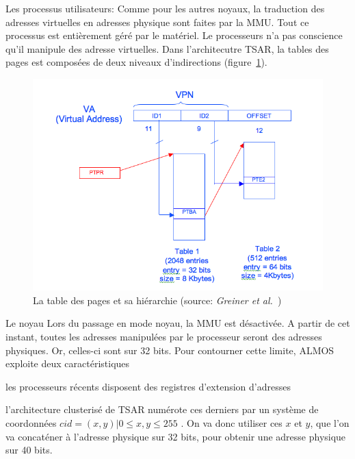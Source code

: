       \begin{paragraph}{Les processus utilisateurs:}
        Comme pour les autres noyaux, la traduction des adresses virtuelles en
        adresses physique sont faites par la MMU. Tout ce processus est
        entièrement géré par le matériel. Le processeurs n'a pas conscience
        qu'il manipule des adresse virtuelles. Dans l'architecutre TSAR, la
        tables des pages est composées de deux niveaux d'indirections
        (figure~\ref{fig:page-table}).
        
        \begin{figure}
          \centering
          \includegraphics[scale=0.35]{include/img/pages_table_levels.png}
          \caption{La table des pages et sa hiérarchie (source: \textit{Greiner
              et al.}~\cite{tsar2008web})}
          \label{fig:page-table}
        \end{figure}
        
      \end{paragraph}
      \begin{paragraph}{Le noyau}
        Lors du passage en mode noyau, la MMU est désactivée. A partir de cet
        instant, toutes les adresses manipulées par le processeur seront des
        adresses physiques. Or, celles-ci sont sur 32 bits. Pour contourner
        cette limite, ALMOS exploite deux caractéristiques \benumline \item les
        processeurs récents disposent des registres d'extension d'adresses \item
        l'architecture clusterisé de TSAR numérote ces derniers par un système
        de coordonnées $cid = (x, y) | 0 \leq x,y \leq 255$ \eenumline. On va
        donc utiliser ces $x$ et $y$, que l'on va concaténer à l'adresse
        physique sur 32 bits, pour obtenir une adresse physique sur 40 bits.
      \end{paragraph}

